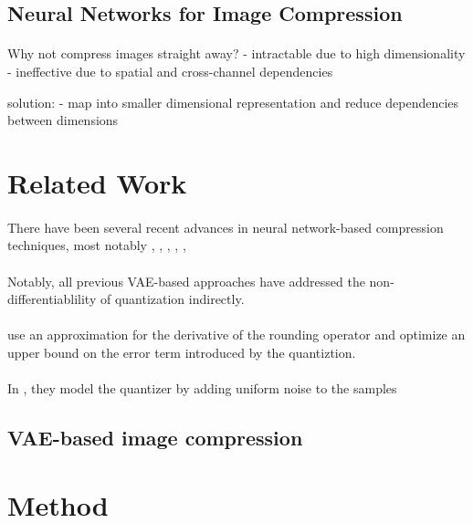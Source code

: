 \documentclass{article}
\begin{document}
\subsection{Neural Networks for Image Compression}
\paragraph{}

Why not compress images straight away?
- intractable due to high dimensionality
- ineffective due to spatial and cross-channel dependencies

solution:
- map into smaller dimensional representation and reduce dependencies between dimensions

\section{Related Work}
\paragraph{}
There have been several recent advances in neural network-based compression
techniques, most notably \cite{balle2016end}, \cite{theis2017lossy},
\cite{rippel2017real}, \cite{balle2018variational}, \cite{johnston2018cvpr},
\cite{mentzer2018cvpr} 
\paragraph{}
Notably, all previous VAE-based approaches have addressed the
non-differentiablility of quantization indirectly.
\paragraph{}
\cite{theis2017lossy} use an approximation for the derivative of the rounding
operator and optimize an upper bound on the error term introduced by the
quantiztion.
\paragraph{}
In \cite{balle2016end},\cite{balle2018variational} they model the quantizer by
adding uniform noise to the samples 
\subsection{VAE-based image compression}
\section{Method}
\end{document}
